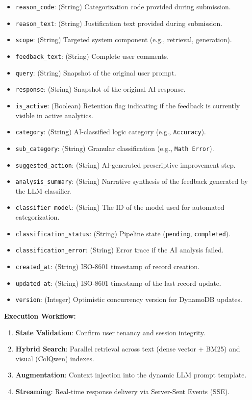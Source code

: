 \begin{itemize}
\begin{itemize}
        \item \texttt{reason\_code}: (String) Categorization code provided during submission.
        \item \texttt{reason\_text}: (String) Justification text provided during submission.
        \item \texttt{scope}: (String) Targeted system component (e.g., retrieval, generation).
        \item \texttt{feedback\_text}: (String) Complete user comments.
        \item \texttt{query}: (String) Snapshot of the original user prompt.
        \item \texttt{response}: (String) Snapshot of the original AI response.
        \item \texttt{is\_active}: (Boolean) Retention flag indicating if the feedback is currently visible in active analytics.
        \item \texttt{category}: (String) AI-classified logic category (e.g., \texttt{Accuracy}).
        \item \texttt{sub\_category}: (String) Granular classification (e.g., \texttt{Math Error}).
        \item \texttt{suggested\_action}: (String) AI-generated prescriptive improvement step.
        \item \texttt{analysis\_summary}: (String) Narrative synthesis of the feedback generated by the LLM classifier.
        \item \texttt{classifier\_model}: (String) The ID of the model used for automated categorization.
        \item \texttt{classification\_status}: (String) Pipeline state (\texttt{pending}, \texttt{completed}).
        \item \texttt{classification\_error}: (String) Error trace if the AI analysis failed.
        \item \texttt{created\_at}: (String) ISO-8601 timestamp of record creation.
        \item \texttt{updated\_at}: (String) ISO-8601 timestamp of the last record update.
        \item \texttt{version}: (Integer) Optimistic concurrency version for DynamoDB updates.
    \end{itemize}
\end{itemize}

\textbf{Execution Workflow:}
\begin{enumerate}
    \item \textbf{State Validation}: Confirm user tenancy and session integrity.
    \item \textbf{Hybrid Search}: Parallel retrieval across text (dense vector + BM25) and visual (ColQwen) indexes.
    \item \textbf{Augmentation}: Context injection into the dynamic LLM prompt template.
    \item \textbf{Streaming}: Real-time response delivery via Server-Sent Events (SSE).
\end{enumerate}


